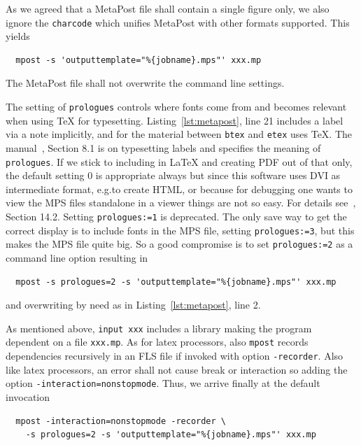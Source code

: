 As we agreed that a MetaPost file shall contain a single figure only, 
we also ignore the \texttt{charcode} which unifies MetaPost with other formats supported. 
This yields 
%
\begin{verbatim}
  mpost -s 'outputtemplate="%{jobname}.mps"' xxx.mp
\end{verbatim}
%
The MetaPost file shall not overwrite the command line settings. 

The setting of \texttt{prologues} controls where fonts come from and 
becomes relevant when using \TeX{} for typesetting. 
Listing~\ref{lst:metapost}, line 21 includes a label via a note implicitly, 
and for the material between \texttt{btex} and \texttt{etex} uses \TeX{}. 
The manual~\cite{MPost24}, Section 8.1 is on typesetting labels 
and specifies the meaning of \texttt{prologues}. 
If we stick to including in \LaTeX{} and creating PDF out of that only, 
the default setting $0$ is appropriate always 
but since this software uses DVI as intermediate format, e.g.\@ to create HTML, 
or because for debugging one wants to view the MPS files standalone in a viewer 
things are not so easy. 
For details see~\cite{MPost24}, Section 14.2. 
Setting \texttt{prologues:=1} is deprecated. 
The only save way to get the correct display is to include fonts in the MPS file, 
setting \texttt{prologues:=3}, but this makes the MPS file quite big. 
So a good compromise is to set \texttt{prologues:=2} as a command line option 
resulting in 
%
\begin{verbatim}
  mpost -s prologues=2 -s 'outputtemplate="%{jobname}.mps"' xxx.mp
\end{verbatim}
%
and overwriting by need as in Listing~\ref{lst:metapost}, line 2. 

As mentioned above, \texttt{input xxx} includes a library 
making the program dependent on a file \texttt{xxx.mp}. 
As for latex processors, also \texttt{mpost} records dependencies recursively 
in an FLS file if invoked with option \texttt{-recorder}. 
Also like latex processors, an error shall not cause break or interaction 
so adding the option \texttt{-interaction=nonstopmode}. 
Thus, we arrive finally at the default invocation 
%
\begin{verbatim}
  mpost -interaction=nonstopmode -recorder \
    -s prologues=2 -s 'outputtemplate="%{jobname}.mps"' xxx.mp
\end{verbatim}











